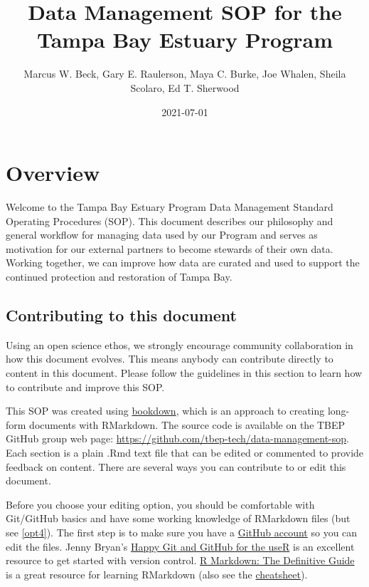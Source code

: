 \documentclass[
]{book}
\title{Data Management SOP for the Tampa Bay Estuary Program}
\author{Marcus W. Beck, Gary E. Raulerson, Maya C. Burke, Joe Whalen, Sheila Scolaro, Ed T. Sherwood}
\date{2021-07-01}
\begin{document}
\maketitle

{
\setcounter{tocdepth}{1}
\tableofcontents
}
\hypertarget{overview}{%
\chapter{Overview}\label{overview}}

Welcome to the Tampa Bay Estuary Program Data Management Standard Operating Procedures (SOP). This document describes our philosophy and general workflow for managing data used by our Program and serves as motivation for our external partners to become stewards of their own data. Working together, we can improve how data are curated and used to support the continued protection and restoration of Tampa Bay.

\hypertarget{contrib}{%
\section{Contributing to this document}\label{contrib}}

Using an open science ethos, we strongly encourage community collaboration in how this document evolves. This means anybody can contribute directly to content in this document. Please follow the guidelines in this section to learn how to contribute and improve this SOP.

This SOP was created using \href{https://bookdown.org/}{bookdown}, which is an approach to creating long-form documents with RMarkdown. The source code is available on the TBEP GitHub group web page: \url{https://github.com/tbep-tech/data-management-sop}. Each section is a plain .Rmd text file that can be edited or commented to provide feedback on content. There are several ways you can contribute to or edit this document.

Before you choose your editing option, you should be comfortable with Git/GitHub basics and have some working knowledge of RMarkdown files (but see \ref{opt4}). The first step is to make sure you have a \href{https://github.com/join}{GitHub account} so you can edit the files. Jenny Bryan's \href{https://happygitwithr.com/}{Happy Git and GitHub for the useR} is an excellent resource to get started with version control. \href{https://bookdown.org/yihui/rmarkdown/}{R Markdown: The Definitive Guide} is a great resource for learning RMarkdown (also see the \href{https://rstudio.com/wp-content/uploads/2015/03/rmarkdown-reference.pdf}{cheatsheet}).
\end{document}
